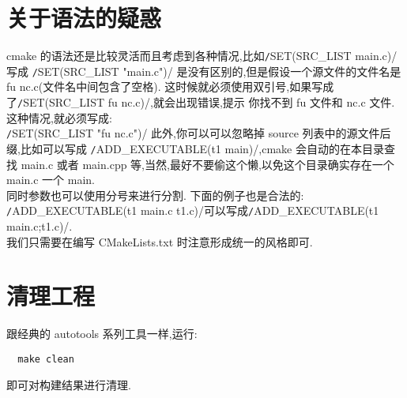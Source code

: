 \documentclass[oneside, 12pt]{book}
\begin{document}
\section{关于语法的疑惑}
cmake 的语法还是比较灵活而且考虑到各种情况,比如\texttt/SET(SRC_LIST main.c)/写成
\texttt/SET(SRC_LIST "main.c")/
是没有区别的,但是假设一个源文件的文件名是 fu nc.c(文件名中间包含了空格). 这时候就必须使用双引号,如果写成了\texttt/SET(SRC_LIST fu nc.c)/,就会出现错误,提示 你找不到 fu 文件和 nc.c 文件.这种情况,就必须写成:\\
\texttt/SET(SRC_LIST "fu nc.c")/
此外,你可以可以忽略掉 source 列表中的源文件后缀,比如可以写成 \texttt/ADD_EXECUTABLE(t1 main)/,cmake 会自动的在本目录查找 main.c 或者 main.cpp 等,当然,最好不要偷这个懒,以免这个目录确实存在一个 main.c 一个 main.\\
同时参数也可以使用分号来进行分割. 下面的例子也是合法的: \texttt/ADD_EXECUTABLE(t1 main.c t1.c)/可以写成\texttt/ADD_EXECUTABLE(t1 main.c;t1.c)/.\\
我们只需要在编写 CMakeLists.txt 时注意形成统一的风格即可.
\section{清理工程}
跟经典的 autotools 系列工具一样,运行: 
\begin{verbatim}
  make clean 
\end{verbatim}
即可对构建结果进行清理.
\end{document}
